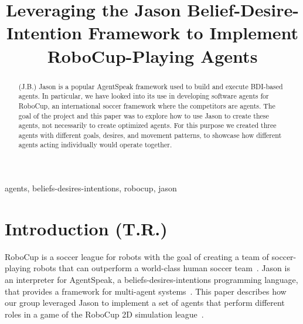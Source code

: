 \documentclass[conference]{IEEEtran}
\begin{document}
\title{Leveraging the Jason Belief-Desire-Intention Framework to Implement RoboCup-Playing Agents\\
}

\author{
\and
{}
\and
{}
\and
{}
}

\maketitle

\begin{abstract}
(J.B.) Jason is a popular AgentSpeak framework used to build and execute BDI-based agents.
In particular, we have looked into its use in developing software agents for RoboCup, an international soccer framework where the competitors are agents.
The goal of the project and this paper was to explore how to use Jason to create these agents, not necessarily to create optimized agents.
For this purpose we created three agents with different goals, desires, and movement patterns, to showcase how different agents acting individually would operate together.
\end{abstract}

\begin{IEEEkeywords}
agents, beliefs-desires-intentions, robocup, jason
\end{IEEEkeywords}

\section{Introduction (T.R.)}
RoboCup is a soccer league for robots with the goal of creating a team of
soccer-playing robots that can outperform a world-class human soccer
team~\cite{robocup-objective}. Jason is an interpreter for AgentSpeak, a
beliefs-desires-intentions programming language, that provides a framework for
multi-agent systems~\cite{jason-description}. This paper describes how our
group leveraged Jason to implement a set of agents that perform different roles
in a game of the RoboCup 2D simulation league~\cite{robocup-simulation-2d}.
\end{document}
